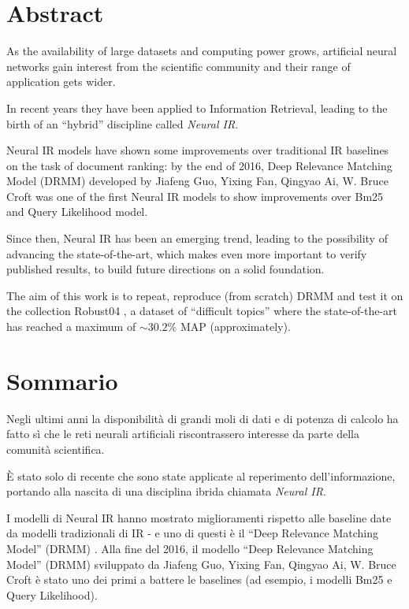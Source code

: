 \cleardoublepage
{}
\section*{Abstract}
\thispagestyle{empty}

As the availability of large datasets and computing power grows, artificial neural networks gain interest from the scientific community and their range of application gets wider.

In recent years they have been applied to Information Retrieval, leading to the birth of an ``hybrid'' discipline called \textit{Neural IR}.

Neural IR models have shown some improvements over traditional IR baselines on the task of document ranking: by the end of 2016, Deep Relevance Matching Model (DRMM) \cite{drmm} developed by Jiafeng Guo, Yixing Fan, Qingyao Ai, W. Bruce Croft was one of the first Neural IR models to show improvements over Bm25 and Query Likelihood model.

Since then, Neural IR has been an emerging trend, leading to the possibility of advancing the state-of-the-art, which makes even more important to verify published results, to build future directions on a solid foundation.

The aim of this work is to repeat, reproduce (from scratch) DRMM and test it on the collection Robust04 \cite{rob04}, a dataset of ``difficult topics'' where the state-of-the-art has reached a maximum of $ \sim 30.2\%$ MAP (approximately).

\bigskip

\cleardoublepage
\section*{Sommario}
\thispagestyle{empty}

Negli ultimi anni la disponibilità di grandi moli di dati e di potenza di calcolo ha fatto sì che le reti neurali artificiali riscontrassero interesse da parte della comunità scientifica.

È stato solo di recente che sono state applicate al reperimento dell'informazione, portando alla nascita di una disciplina ibrida chiamata \textit{Neural IR}.

I modelli di Neural IR hanno mostrato miglioramenti rispetto alle baseline date da modelli tradizionali di IR - e uno di questi è il ``Deep Relevance Matching Model'' (DRMM) \cite{drmm}. Alla fine del 2016, il modello ``Deep Relevance Matching Model'' (DRMM) sviluppato da  Jiafeng Guo, Yixing Fan, Qingyao Ai, W. Bruce Croft è stato uno dei primi a battere le baselines (ad esempio, i modelli Bm25 e Query Likelihood).

